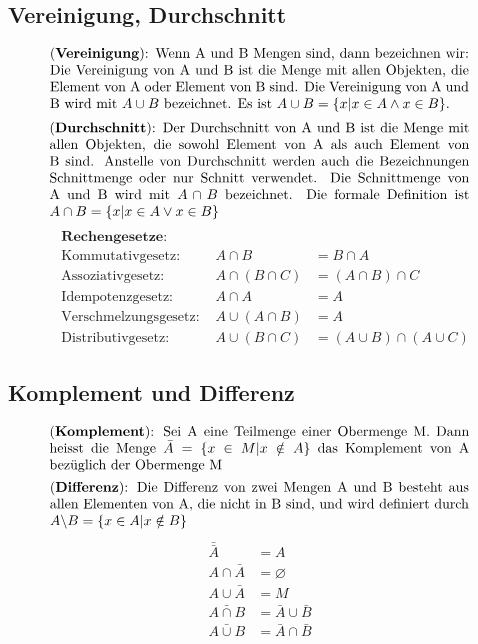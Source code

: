 \documentclass[../Main.tex]{subfiles}
\begin{document}
\subsection{Vereinigung, Durchschnitt}
\begin{equation}
    \parbox{30em}{(\textbf{Vereinigung}): Wenn A und B Mengen sind, dann bezeichnen wir: 
    Die Vereinigung von A und B ist die Menge mit allen Objekten, die Element von 
    A oder Element von B sind. Die Vereinigung von A und B wird mit \(A \cup B\) bezeichnet. Es ist \(A \cup B = \{x|x \in A \land x \in B\}\).}
\end{equation}
\begin{equation}
    \parbox{30em}{(\textbf{Durchschnitt}): Der Durchschnitt von A und B ist die Menge mit allen Objekten, die sowohl 
    Element von A als auch Element von B sind. Anstelle von Durchschnitt werden
    auch die Bezeichnungen Schnittmenge oder nur Schnitt verwendet. Die Schnittmenge von A und B wird mit \(A \cap B\) bezeichnet. Die formale Definition ist \(A \cap B = \{x|x \in A \lor x \in B\}\)}
\end{equation}
\begin{equation}
    \begin{aligned}
        &\textbf{Rechengesetze}: \\
        &\text{Kommutativgesetz: } &A \cap B &= B \cap A \\
        &\text{Assoziativgesetz: } &A \cap (B \cap C) &= (A \cap B) \cap C \\
        &\text{Idempotenzgesetz: } &A \cap A &= A \\
        &\text{Verschmelzungsgesetz: } &A \cup (A \cap B) &= A \\
        &\text{Distributivgesetz: } &A \cup (B \cap C) &= (A \cup B) \cap (A \cup C)
    \end{aligned}
\end{equation}
\subsection{Komplement und Differenz}
\begin{equation}
    \parbox{30em}{(\textbf{Komplement}): Sei A eine Teilmenge einer Obermenge M. Dann heisst die Menge 
    \(\bar{A}=\{x \in M | x \notin A\}\) das Komplement von A bezüglich der Obermenge M}
\end{equation}
\begin{equation}
    \parbox{30em}{(\textbf{Differenz}): Die Differenz von zwei Mengen A und B besteht aus allen Elementen 
    von A, die nicht in B sind, und wird definiert durch \(A \backslash B = \{x \in A | x \notin B\}\)}
\end{equation}
\begin{equation}
    \begin{aligned}
        \bar{\bar{A}} &= A \\
        A \cap \bar{A} &= \varnothing \\
        A \cup \bar{A} &= M \\
        \bar{A \cap B} &= \bar{A} \cup \bar{B} \\
        \bar{A \cup B} &= \bar{A} \cap \bar{B}
    \end{aligned}
\end{equation}
\end{document}
